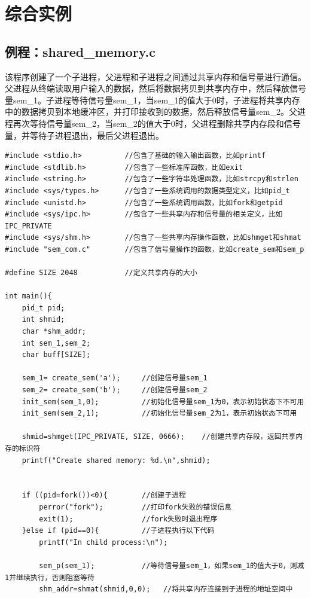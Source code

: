 \documentclass[12pt, a4paper, oneside]{ctexbook}
\numberwithin{figure}{section}
\begin{document}
\section{综合实例}

\subsection{例程：shared\_memory.c}
该程序创建了一个子进程，父进程和子进程之间通过共享内存和信号量进行通信。父进程从终端读取用户输入的数据，然后将数据拷贝到共享内存中，然后释放信号量sem_1。子进程等待信号量sem_1，当sem_1的值大于0时，子进程将共享内存中的数据拷贝到本地缓冲区，并打印接收到的数据，然后释放信号量sem_2。父进程再次等待信号量sem_2，当sem_2的值大于0时，父进程删除共享内存段和信号量，并等待子进程退出，最后父进程退出。

\begin{verbatim}
#include <stdio.h>          //包含了基础的输入输出函数，比如printf
#include <stdlib.h>         //包含了一些标准库函数，比如exit
#include <string.h>         //包含了一些字符串处理函数，比如strcpy和strlen
#include <sys/types.h>      //包含了一些系统调用的数据类型定义，比如pid_t
#include <unistd.h>         //包含了一些系统调用函数，比如fork和getpid
#include <sys/ipc.h>        //包含了一些共享内存和信号量的相关定义，比如IPC_PRIVATE
#include <sys/shm.h>        //包含了一些共享内存操作函数，比如shmget和shmat
#include "sem_com.c"        //包含了信号量操作的函数，比如create_sem和sem_p

#define SIZE 2048           //定义共享内存的大小

int main(){
    pid_t pid;
    int shmid;
    char *shm_addr;
    int sem_1,sem_2;
    char buff[SIZE];

    sem_1= create_sem('a');     //创建信号量sem_1
    sem_2= create_sem('b');     //创建信号量sem_2
    init_sem(sem_1,0);          //初始化信号量sem_1为0，表示初始状态下不可用
    init_sem(sem_2,1);          //初始化信号量sem_2为1，表示初始状态下可用

    shmid=shmget(IPC_PRIVATE, SIZE, 0666);    //创建共享内存段，返回共享内存的标识符
    printf("Create shared memory: %d.\n",shmid);


    if ((pid=fork())<0){        //创建子进程
        perror("fork");         //打印fork失败的错误信息
        exit(1);                //fork失败时退出程序
    }else if (pid==0){          //子进程执行以下代码
        printf("In child process:\n");

        sem_p(sem_1);           //等待信号量sem_1，如果sem_1的值大于0，则减1并继续执行，否则阻塞等待
        shm_addr=shmat(shmid,0,0);   //将共享内存连接到子进程的地址空间中


\end{verbatim}
\end{document}
